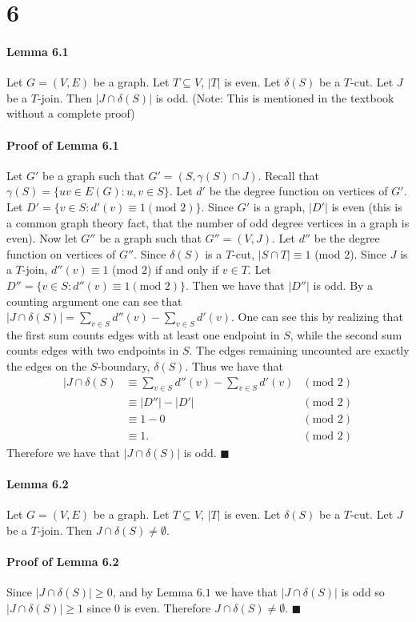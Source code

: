 \documentclass[letterpaper,12pt,oneside,onecolumn]{article}
\begin{document}
\section*{6}
\paragraph{Lemma 6.1}
Let $G=(V,E)$ be a graph. Let $T \subseteq V$, $|T|$ is even. Let $\delta(S)$ be a $T$-cut. Let $J$ be a $T$-join. Then $|J \cap \delta(S)|$ is odd. (Note: This is mentioned in the textbook without a complete proof)
\paragraph{Proof of Lemma 6.1}
Let $G'$ be a graph such that $G' = (S, \gamma(S) \cap J)$. Recall that $\gamma(S) = \{ uv \in E(G) : u, v \in S\}$. Let $d'$ be the degree function on vertices of $G'$. Let $D' = \{ v \in S : d'(v) \equiv 1 (\text{mod }2)\}$. Since $G'$ is a graph, $|D'|$ is even (this is a common graph theory fact, that the number of odd degree vertices in a graph is even). Now let $G''$ be a graph such that $G'' = (V, J)$. Let $d''$ be the degree function on vertices of $G''$. Since $\delta(S)$ is a $T$-cut, $|S \cap T| \equiv 1$ (mod $2$). Since $J$ is a $T$-join, $d''(v) \equiv 1$ (mod $2$) if and only if $v \in T$. Let $D'' = \{v \in S : d''(v) \equiv 1 (\text{mod }2)\}$. Then we have that $|D''|$ is odd. By a counting argument one can see that $|J \cap \delta(S)| = \sum_{v \in S} d''(v) - \sum_{v \in S} d'(v)$. One can see this by realizing that the first sum counts edges with at least one endpoint in $S$, while the second sum counts edges with two endpoints in $S$. The edges remaining uncounted are exactly the edges on the $S$-boundary, $\delta(S)$. Thus we have that
\begin{align*}
|J \cap \delta(S) &\equiv \sum_{v \in S} d''(v) - \sum_{v \in S} d'(v) &(\text{mod }2)\\
&\equiv |D''| - |D'| &(\text{mod }2)\\
&\equiv 1 - 0 &(\text{mod }2)\\
&\equiv 1. &(\text{mod }2)
\end{align*}
Therefore we have that $|J \cap \delta(S)|$ is odd. $\blacksquare$
\paragraph{Lemma 6.2}
Let $G=(V,E)$ be a graph. Let $T \subseteq V$, $|T|$ is even. Let $\delta(S)$ be a $T$-cut. Let $J$ be a $T$-join. Then $J \cap \delta(S) \neq \emptyset$.
\paragraph{Proof of Lemma 6.2}
Since $|J \cap \delta(S)| \geq 0$, and by Lemma $6.1$ we have that $|J \cap \delta(S)|$ is odd so $|J \cap \delta(S)| \geq 1$ since $0$ is even. Therefore $J \cap \delta(S) \neq \emptyset$. $\blacksquare$
\end{document}
